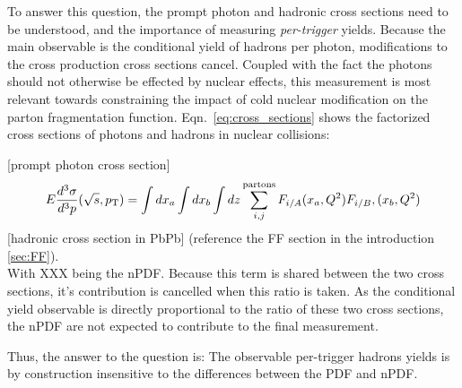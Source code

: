 To answer this question, the prompt photon and hadronic cross sections need to be understood, and the importance of measuring  \textit{per-trigger} yields. Because the main observable is the conditional yield of hadrons per photon, modifications to the cross production cross sections cancel. Coupled with the fact the photons should not otherwise be effected by nuclear effects, this measurement is most relevant towards constraining the impact of cold nuclear modification on the parton fragmentation function. Eqn.~\ref{eq:cross_sections} shows the factorized cross sections of photons and hadrons in nuclear collisions:

[prompt photon cross section]\\
  \begin{equation}
    E\frac{d^3\sigma}{d^3p}(\sqrt{s},\pt) = \int dx_a \int dx_b \int dz \sum^\mathrm{partons}_{i,j}F_{i/A}(x_a,Q^2)F_{i/B},(x_b,Q^2)
    
  \end{equation}
[hadronic cross section in PbPb] (reference the FF section in the introduction \ref{sec:FF}).\\

With XXX being the nPDF. Because this term is shared between the two cross sections, it's contribution is cancelled when this ratio is taken. As the conditional yield observable is directly proportional to the ratio of these two cross sections, the nPDF are not expected to contribute to the final measurement.

Thus, the answer to the question is: The observable per-trigger hadrons yields is by construction insensitive to the differences between the PDF and nPDF.

